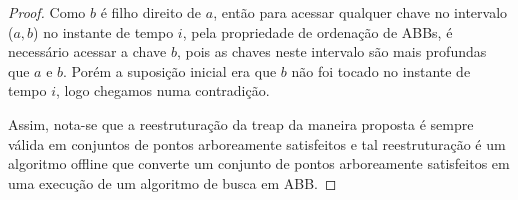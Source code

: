 \begin{proof}
Como $b$ é filho direito de $a$, então para acessar qualquer chave no intervalo ($a,b$) no instante de tempo $i$, pela propriedade de ordenação de ABBs, é necessário acessar a chave $b$, pois as chaves neste intervalo são mais profundas que $a$ e $b$. Porém a suposição inicial era que $b$ não foi tocado no instante de tempo $i$, logo chegamos numa contradição.

Assim, nota-se que a reestruturação da treap da maneira proposta é sempre válida em conjuntos de pontos arboreamente satisfeitos e tal reestruturação é um algoritmo offline que converte um conjunto de pontos arboreamente satisfeitos em uma execução de um algoritmo de busca em ABB.
\end{proof}

